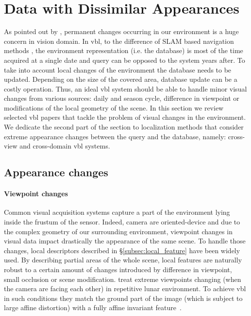 \section{Data with Dissimilar Appearances}
\label{sec:changing_environment}	

	

	As pointed out by \citet{Lowry2016}, permanent changes occurring in our environment is a huge concern in vision domain. In \ac{vbl}, to the difference of SLAM based navigation methods \citep{Garcia-Fidalgo2015,Lowry2016}, the environment representation (i.e. the database) is most of the time acquired at a single date and query can be opposed to the system years after. To take into account local changes of the environment the database needs to be updated. Depending on the size of the covered area, database update can be a costly operation. Thus, an ideal \ac{vbl} system should be able to handle minor visual changes from various sources: daily and season cycle, difference in viewpoint or modifications of the local geometry of the scene. In this section we review selected \ac{vbl} papers that tackle the problem of visual changes in the environment. We dedicate the second part of the section to localization methods that consider extreme appearance changes between the query and the database, namely: cross-view and cross-domain \ac{vbl} systems.
	
	\subsection{Appearance changes}
	\label{subsec:appearance}
		\paragraph{Viewpoint changes}		
			\label{para:viewpoint}
			Common visual acquisition systems capture a part of the environment lying inside the frustum of the sensor. Indeed, camera are oriented-device and due to the complex geometry of our surrounding environment, viewpoint changes in visual data impact drastically the appearance of the same scene. To handle those changes, local descriptors described in \S\ref{subsec:local_feature} have been widely used. By describing partial areas of the whole scene, local features are naturally robust to a certain amount of changes introduced by difference in viewpoint, small occlusion or scene modification. \citet{Wan2014} treat extreme viewpoints changing (when the camera are facing each other) in repetitive lunar environment. To achieve \ac{vbl} in such conditions they match the ground part of the image (which is subject to large affine distortion) with a fully affine invariant feature~\citep{Morel2009}.
			
